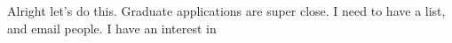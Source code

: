 \noindent {}

Alright let's do this. Graduate applications are super close. I need to have a list, and email people. I have an interest in 

